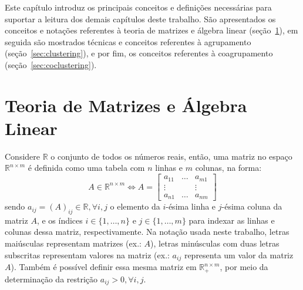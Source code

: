 \documentclass[
    12pt,                %
    oneside,            %
    a4paper,            %
    english,            %
    brazil                %
    ]{abntex2ppgsi}
\begin{document}
Este capítulo introduz os principais conceitos e definições necessárias para suportar a leitura dos demais capítulos deste trabalho.
São apresentados os conceitos e notações referentes à teoria de matrizes e álgebra linear (seção~\ref{sec:matrix-alglin}), em seguida são mostrados técnicas e conceitos referentes à agrupamento (seção~\ref{sec:clustering}), e por fim, os conceitos referentes à coagrupamento (seção~\ref{sec:coclustering}).

\section{Teoria de Matrizes e Álgebra Linear}
\label{sec:matrix-alglin}

Considere $\mathbb{R}$ o conjunto de todos os números reais, então, uma matriz no espaço $\mathbb{R}^{n \times m}$ é definida como uma tabela com $n$ linhas e $m$ colunas, na forma:
\[
    A \in \mathbb{R}^{n \times m} \Leftrightarrow A = \begin{bmatrix}
                                                                     a_{1 1} & \hdots & a_{m 1} \\
                                                                     \vdots  &        & \vdots  \\
                                                                     a_{n 1} & \hdots & a_{n m}
                                                                 \end{bmatrix}
\]
sendo $a_{i j} = (A)_{ij} \in \mathbb{R}, \forall i, j$ o elemento da $i$-ésima linha e $j$-ésima coluna da matriz $A$, e os índices $i \in \{1, \dots, n\}$ e $j \in \{1, \dots, m\}$ para indexar as linhas e colunas dessa matriz, respectivamente.
Na notação usada neste trabalho, letras maiúsculas representam matrizes (ex.: $A$), letras minúsculas com duas letras subscritas representam valores na matriz (ex.: $a_{ij}$ representa um valor da matriz $A$).
Também é possível definir essa mesma matriz em $\mathbb{R}^{n \times m}_{+}$, por meio da determinação da restrição $a_{ij} > 0, \forall i,j$.
\end{document}
